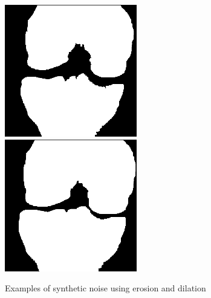 \begin{figure}[H]
\endminipage\hfill
{}%
  \includegraphics[width=\linewidth]{imgs/orig_seg2.png}
\endminipage\hfill
{}%
  \includegraphics[width=\linewidth]{imgs/noisy_seg2.png}
\endminipage
\caption{Examples of synthetic noise using erosion and dilation}
\end{figure}


